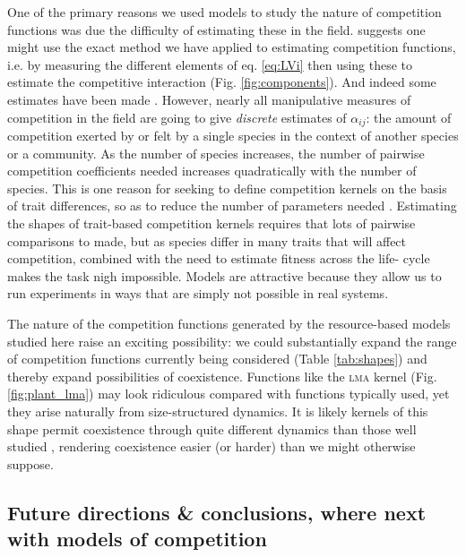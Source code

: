 \documentclass[a4paper,11pt]{article}
\begin{document}
One of the primary reasons we used models to study the nature of
competition functions was due the difficulty of estimating these in
the field.
\citet{Ricklefs-1973} suggests one might use the exact method we have
applied to estimating competition functions, i.e. by measuring the
different elements of eq. \ref{eq:LVi} then using these to estimate
the competitive interaction (Fig. \ref{fig:components}).
And indeed some estimates have been made \citep{Ricklefs-1973,
  Kraft-2015}.
%
However, nearly all manipulative measures of competition in the field
are going to give \emph{discrete} estimates of $\alpha_{ij}$: the
amount of competition exerted by or felt by a single species in the
context of another species or a community. As the number of species
increases, the number of pairwise competition coefficients needed
increases quadratically with the number of species. This is one reason
for seeking to define competition kernels on the basis of trait
differences, so as to reduce the number of parameters needed
\citep{Kraft-2015}. Estimating the shapes of trait-based competition
kernels requires that lots of pairwise comparisons to made, but as
species differ in many traits that will affect competition, combined
with the need to estimate fitness across the life- cycle makes the
task nigh impossible. Models are attractive because they allow us to
run experiments in ways that are simply not possible in real systems.

The nature of the competition functions generated by the
resource-based models studied here raise an exciting possibility: we
could substantially expand the range of competition functions
currently being considered (Table \ref{tab:shapes}) and thereby expand
possibilities of coexistence. Functions like the \textsc {lma} kernel
(Fig. \ref{fig:plant_lma}) may look ridiculous compared with functions
typically used, yet they arise naturally from size-structured
dynamics.  It is likely kernels of this shape permit coexistence
through quite different dynamics than those well studied
\citep[e.g.][]{Leimar-2013}, rendering coexistence easier (or harder)
than we might otherwise suppose.

\subsection{Future directions \& conclusions, where next with models of
competition}
\end{document}
